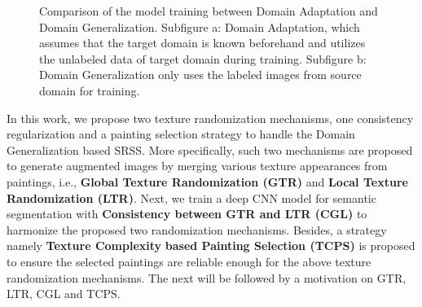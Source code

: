 \documentclass[twocolumn,journal,vlined,ruled,linesnumbered]{IEEEtran}
\begin{document}
\begin{figure}[t]
\begin{centering}
\par\end{centering}
\noindent \begin{centering}
\vspace{-2mm}
\par\end{centering}
\noindent \begin{centering}
\par\end{centering}
\noindent \centering{}
\vspace{-2mm}
\caption{Comparison of the model training between Domain Adaptation and Domain
Generalization. Subfigure a: Domain Adaptation, which assumes that
the target domain is known beforehand and utilizes the unlabeled data
of target domain during training. Subfigure b: Domain Generalization
only uses the labeled images from source domain for training.}
\vspace{-5mm}
\end{figure}

In this work, we propose\textcolor{red}{{} }two texture randomization mechanisms, one consistency regularization and a painting selection strategy to handle the Domain Generalization based SRSS. More specifically, such two mechanisms are proposed to generate augmented images by merging various texture appearances from paintings, i.e., \textbf{Global Texture Randomization (GTR)} and \textbf{Local Texture Randomization (LTR)}. Next, we train a deep CNN model for semantic segmentation with \textbf{Consistency between GTR and LTR (CGL) }to harmonize the proposed two randomization mechanisms. Besides, a strategy namely\textbf{ Texture Complexity} \textbf{based Painting Selection (TCPS)} is proposed to ensure the selected paintings are reliable enough for the above texture randomization mechanisms. The next will be followed by a motivation on GTR, LTR, CGL and TCPS.
\end{document}
